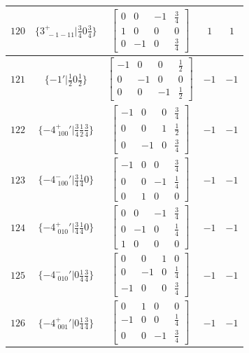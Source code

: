 \documentclass[fleqn,8pt]{jsarticle}
\begin{document}
\begin{longtable}{ccccc}
$ 120 $ & $ \{3^{+}_{\,\,-1-11}|\frac{3}{4} 0 \frac{3}{4}\} $ & $ \begin{bmatrix} 0 & 0 & -1 & \frac{3}{4} \\ 1 & 0 & 0 & 0 \\ 0 & -1 & 0 & \frac{3}{4} \end{bmatrix} $ & $ 1 $ & $ 1 $ \\ \hline
$ 121 $ & $ \{-1{}'|\frac{1}{2} 0 \frac{1}{2}\} $ & $ \begin{bmatrix} -1 & 0 & 0 & \frac{1}{2} \\ 0 & -1 & 0 & 0 \\ 0 & 0 & -1 & \frac{1}{2} \end{bmatrix} $ & $ -1 $ & $ -1 $ \\ \hline
$ 122 $ & $ \{-4^{+}_{\,\,100}{}'|\frac{3}{4} \frac{1}{2} \frac{3}{4}\} $ & $ \begin{bmatrix} -1 & 0 & 0 & \frac{3}{4} \\ 0 & 0 & 1 & \frac{1}{2} \\ 0 & -1 & 0 & \frac{3}{4} \end{bmatrix} $ & $ -1 $ & $ -1 $ \\ \hline
$ 123 $ & $ \{-4^{-}_{\,\,100}{}'|\frac{3}{4} \frac{1}{4} 0\} $ & $ \begin{bmatrix} -1 & 0 & 0 & \frac{3}{4} \\ 0 & 0 & -1 & \frac{1}{4} \\ 0 & 1 & 0 & 0 \end{bmatrix} $ & $ -1 $ & $ -1 $ \\ \hline
$ 124 $ & $ \{-4^{+}_{\,\,010}{}'|\frac{3}{4} \frac{1}{4} 0\} $ & $ \begin{bmatrix} 0 & 0 & -1 & \frac{3}{4} \\ 0 & -1 & 0 & \frac{1}{4} \\ 1 & 0 & 0 & 0 \end{bmatrix} $ & $ -1 $ & $ -1 $ \\ \hline
$ 125 $ & $ \{-4^{-}_{\,\,010}{}'|0 \frac{1}{4} \frac{3}{4}\} $ & $ \begin{bmatrix} 0 & 0 & 1 & 0 \\ 0 & -1 & 0 & \frac{1}{4} \\ -1 & 0 & 0 & \frac{3}{4} \end{bmatrix} $ & $ -1 $ & $ -1 $ \\ \hline
$ 126 $ & $ \{-4^{+}_{\,\,001}{}'|0 \frac{1}{4} \frac{3}{4}\} $ & $ \begin{bmatrix} 0 & 1 & 0 & 0 \\ -1 & 0 & 0 & \frac{1}{4} \\ 0 & 0 & -1 & \frac{3}{4} \end{bmatrix} $ & $ -1 $ & $ -1 $ \\ \hline

\end{longtable}
\end{document}
